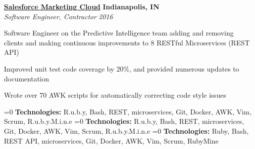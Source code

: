 %
    \headerrow
        {\textbf{\href{https://www.marketingcloud.com/}{Salesforce Marketing Cloud}}}
        {\textbf{Indianapolis, IN}}
    \\
    \headerrow
        {\emph{Software Engineer, Contractor}}
        {\emph{2016}}
    \begin{itemize*}
        \item Software Engineer on the Predictive Intelligence team adding and removing clients
            and making continuous improvements to 8 RESTful Microservices (REST API)
        \item Improved unit test code coverage by 20\%, and provided numerous updates to documentation
        \item Wrote over 70 AWK scripts for automatically correcting code style issues
    \end{itemize*}

    \ifnum{}=0
        \hspace{1.0em}
        {\textbf{Technologies:} R.u.b.y, Bash, REST, microservices, Git, Docker, AWK, Vim, Scrum, R.u.b.y.M.i.n.e}
    \fi
    \ifnum{}=0
        \hspace{1.0em}
        {\textbf{Technologies:} R.u.b.y, Bash, REST, microservices, Git, Docker, AWK, Vim, Scrum, R.u.b.y.M.i.n.e}
    \fi
    \ifnum{}=0
        \hspace{1.0em}
        {\textbf{Technologies:} Ruby, Bash, REST API, microservices, Git, Docker, AWK, Vim, Scrum, RubyMine}
    \fi
